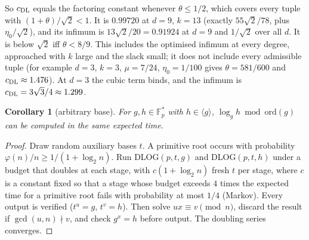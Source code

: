 \documentclass[11pt]{amsart}
\newtheorem{corollary}[theorem]{Corollary}
\theoremstyle{definition}
\newcommand{\F}{\mathbb{F}}
\begin{document}
So $c_{\rm DL}$ equals the factoring constant whenever $\theta\le1/2$, which covers every tuple with $(1+\theta)/\sqrt2<1$. It is $0.99720$ at
$d=9$, $k=13$ (exactly $55\sqrt2/78$, plus $\eta_0/\sqrt2$), and its infimum is $13\sqrt2/20=0.91924$ at $d=9$ and $1/\sqrt2$ over all $d$.
It is below $\sqrt2$ iff $\theta<8/9$. This includes the optimised infimum at every degree, approached with $k$ large and the slack small; it
does not include every admissible tuple (for example $d=3$, $k=3$, $\mu=7/24$, $\eta_0=1/100$ gives $\theta=581/600$ and $c_{\rm DL}\approx1.476$). At
$d=3$ the cubic term binds, and the infimum is $c_{\rm DL}=3\sqrt3/4\approx1.299$.

\begin{corollary}[arbitrary base]\label{cor:DLprime}
For $g,h\in\F_p^*$ with $h\in\langle g\rangle$, $\log_gh\bmod\mathrm{ord}(g)$ can be computed in the same expected time.
\end{corollary}

\begin{proof}
Draw random auxiliary bases $t$. A primitive root occurs with probability $\varphi(n)/n\ge1/(1+\log_2n)$. Run DLOG$(p,t,g)$ and DLOG$(p,t,h)$
under a budget that doubles at each stage, with $c(1+\log_2n)$ fresh $t$ per stage, where $c$ is a constant fixed so that a stage whose
budget exceeds $4$ times the expected time for a primitive root fails with probability at most $1/4$ (Markov). Every output is verified ($t^u=g$,
$t^v=h$). Then solve $ux\equiv v\pmod n$, discard the result if $\gcd(u,n)\nmid v$, and check $g^x=h$ before output. The doubling series converges.
\end{proof}
\end{document}
